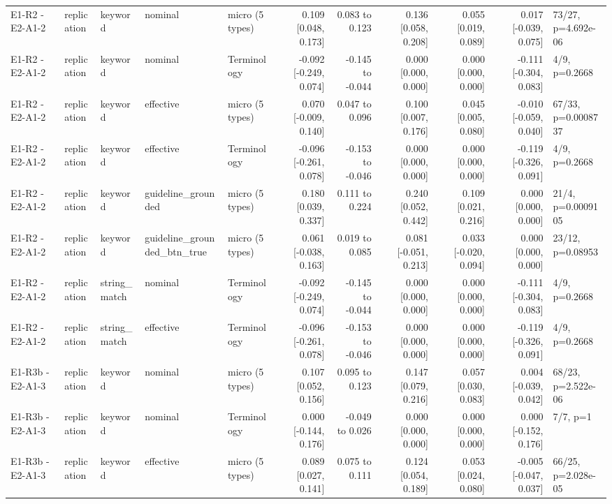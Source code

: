 \begin{table}[t]
\begin{tabular}{lllllrrrrrl}
E1-R2 - E2-A1-2 & replication & keyword & nominal & micro (5 types) & 0.109 [0.048, 0.173] & 0.083 to 0.123 & 0.136 [0.058, 0.208] & 0.055 [0.019, 0.089] & 0.017 [-0.039, 0.075] & 73/27, p=4.692e-06 \\
E1-R2 - E2-A1-2 & replication & keyword & nominal & Terminology & -0.092 [-0.249, 0.074] & -0.145 to -0.044 & 0.000 [0.000, 0.000] & 0.000 [0.000, 0.000] & -0.111 [-0.304, 0.083] & 4/9, p=0.2668 \\
E1-R2 - E2-A1-2 & replication & keyword & effective & micro (5 types) & 0.070 [-0.009, 0.140] & 0.047 to 0.096 & 0.100 [0.007, 0.176] & 0.045 [0.005, 0.080] & -0.010 [-0.059, 0.040] & 67/33, p=0.0008737 \\
E1-R2 - E2-A1-2 & replication & keyword & effective & Terminology & -0.096 [-0.261, 0.078] & -0.153 to -0.046 & 0.000 [0.000, 0.000] & 0.000 [0.000, 0.000] & -0.119 [-0.326, 0.091] & 4/9, p=0.2668 \\
E1-R2 - E2-A1-2 & replication & keyword & guideline\_grounded & micro (5 types) & 0.180 [0.039, 0.337] & 0.111 to 0.224 & 0.240 [0.052, 0.442] & 0.109 [0.021, 0.216] & 0.000 [0.000, 0.000] & 21/4, p=0.0009105 \\
E1-R2 - E2-A1-2 & replication & keyword & guideline\_grounded\_btn\_true & micro (5 types) & 0.061 [-0.038, 0.163] & 0.019 to 0.085 & 0.081 [-0.051, 0.213] & 0.033 [-0.020, 0.094] & 0.000 [0.000, 0.000] & 23/12, p=0.08953 \\
E1-R2 - E2-A1-2 & replication & string\_match & nominal & Terminology & -0.092 [-0.249, 0.074] & -0.145 to -0.044 & 0.000 [0.000, 0.000] & 0.000 [0.000, 0.000] & -0.111 [-0.304, 0.083] & 4/9, p=0.2668 \\
E1-R2 - E2-A1-2 & replication & string\_match & effective & Terminology & -0.096 [-0.261, 0.078] & -0.153 to -0.046 & 0.000 [0.000, 0.000] & 0.000 [0.000, 0.000] & -0.119 [-0.326, 0.091] & 4/9, p=0.2668 \\
E1-R3b - E2-A1-3 & replication & keyword & nominal & micro (5 types) & 0.107 [0.052, 0.156] & 0.095 to 0.123 & 0.147 [0.079, 0.216] & 0.057 [0.030, 0.083] & 0.004 [-0.039, 0.042] & 68/23, p=2.522e-06 \\
E1-R3b - E2-A1-3 & replication & keyword & nominal & Terminology & 0.000 [-0.144, 0.176] & -0.049 to 0.026 & 0.000 [0.000, 0.000] & 0.000 [0.000, 0.000] & 0.000 [-0.152, 0.176] & 7/7, p=1 \\
E1-R3b - E2-A1-3 & replication & keyword & effective & micro (5 types) & 0.089 [0.027, 0.141] & 0.075 to 0.111 & 0.124 [0.054, 0.189] & 0.053 [0.024, 0.080] & -0.005 [-0.047, 0.037] & 66/25, p=2.028e-05 \\

\end{tabular}
\end{table}
